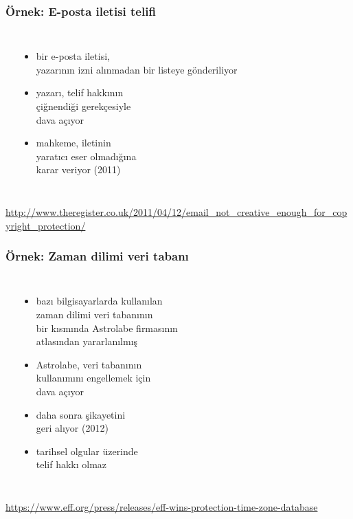 \documentclass[dvipsnames]{beamer}
\theoremstyle{definition}
\theoremstyle{example}
\theoremstyle{plain}
\begin{document}
\begin{frame}
  \frametitle{Örnek: E-posta iletisi telifi}

  \begin{columns}
    \begin{center}
    \end{center}

    \begin{itemize}
      \item bir e-posta iletisi,\\
        yazarının izni alınmadan\/
        bir listeye gönderiliyor
      \item yazarı, telif hakkının\\
        çiğnendiği gerekçesiyle\\
        dava açıyor
      \item mahkeme, iletinin\\
        yaratıcı eser olmadığına\\
        karar veriyor (2011)
    \end{itemize}
  \end{columns}

  \medskip
  \tiny{\url{http://www.theregister.co.uk/2011/04/12/email_not_creative_enough_for_copyright_protection/}}\\
\end{frame}

\begin{frame}
  \frametitle{Örnek: Zaman dilimi veri tabanı}

  \begin{columns}
    \begin{center}
    \end{center}

    \begin{itemize}
      \item bazı bilgisayarlarda kullanılan\\
        zaman dilimi veri tabanının\\
        bir kısmında Astrolabe firmasının\\
        atlasından yararlanılmış
      \item Astrolabe, veri tabanının\\
        kullanımını engellemek için\\
        dava açıyor
      \item daha sonra şikayetini\\
        geri alıyor (2012)
      \item tarihsel olgular üzerinde\\
        telif hakkı olmaz
    \end{itemize}
  \end{columns}

  \medskip
  \tiny{\url{https://www.eff.org/press/releases/eff-wins-protection-time-zone-database}}\\
\end{frame}
\end{document}
